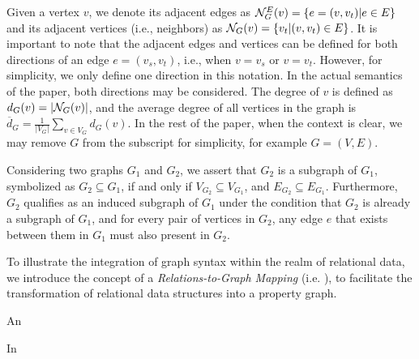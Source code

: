 Given a vertex $v$, we denote its adjacent edges as ${\mathcal{N}}_G^E(v) = \{e = (v, v_t) | e \in E\}$ and its adjacent vertices (i.e., neighbors) as ${\mathcal{N}}_G(v) = \{v_t | (v, v_t) \in E\}$. It is important to note that the adjacent edges and vertices can be defined for both directions of an edge $e = (v_s, v_t)$, i.e., when $v = v_s$ or $v = v_t$. However, for simplicity, we only define one direction in this notation. In the actual semantics of the paper, both directions may be considered. The degree of $v$ is defined as $d_G(v) = |{\mathcal{N}}_G(v)|$, and the average degree of all vertices in the graph is $\overline{d}_G = \frac{1}{|V_G|} \sum_{v \in V_G} d_G(v)$.
In the rest of the paper, when the context is clear, we may remove $G$ from the subscript for simplicity, for example $G=(V, E)$.

Considering two graphs \(G_1\) and \(G_2\), we assert that \(G_2\) is a subgraph of \(G_1\), symbolized as \(G_2 \subseteq G_1\), if and only if \(V_{G_2} \subseteq V_{G_1}\), and \(E_{G_2} \subseteq E_{G_1}\). Furthermore, \(G_2\) qualifies as an induced subgraph of \(G_1\) under the condition that \(G_2\) is already a subgraph of \(G_1\), and for every pair of vertices in \(G_2\), any edge \(e\) that exists between them in \(G_1\) must also present in \(G_2\).

To illustrate the integration of graph syntax within the realm of relational data, we introduce the concept of a \textit{Relations-to-Graph Mapping} (i.e. \rgmapping), to facilitate the transformation of relational data structures into a property graph.

An 

In 

